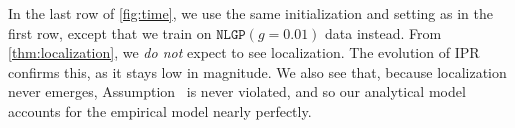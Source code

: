 In the last row of \cref{fig:time}, we use the same initialization and setting as in the first row, except that we train on $\texttt{NLGP}(g=0.01)$ data instead.
From \cref{thm:localization}, we \emph{do not} expect to see localization.
The evolution of IPR confirms this, as it stays low in magnitude.
We also see that, because localization never emerges, Assumption~ is never violated, and so our analytical model accounts for the empirical model nearly perfectly.


